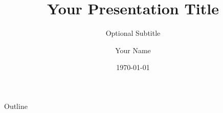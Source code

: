 \documentclass{beamer}
\title{Your Presentation Title}
\subtitle{Optional Subtitle}
\author{Your Name}
\institute{Your Institution}
\date{\today}
\begin{document}
\begin{frame}
    \titlepage
\end{frame}

\begin{frame}{Outline}
    \tableofcontents
\end{frame}

\end{document}
